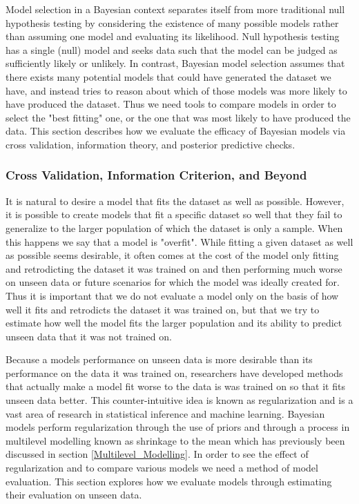 Model selection in a Bayesian context separates itself from more traditional null hypothesis testing by considering the existence of many possible models rather than assuming one model and evaluating its likelihood. Null hypothesis testing has a single (null) model and seeks data such that the model can be judged as sufficiently likely or unlikely. In contrast, Bayesian model selection assumes that there exists many potential models that could have generated the dataset we have, and instead tries to reason about which of those models was more likely to have produced the dataset. Thus we need tools to compare models in order to select the "best fitting" one, or the one that was most likely to have produced the data. This section describes how we evaluate the efficacy of Bayesian models via cross validation, information theory, and posterior predictive checks.

\subsubsection{Cross Validation, Information Criterion, and Beyond}
It is natural to desire a model that fits the dataset as well as possible. However, it is possible to create models that fit a specific dataset so well that they fail to generalize to the larger population of which the dataset is only a sample. When this happens we say that a model is "overfit". While fitting a given dataset as well as possible seems desirable, it often comes at the cost of the model only fitting and retrodicting the dataset it was trained on and then performing much worse on unseen data or future scenarios for which the model was ideally created for. Thus it is important that we do not evaluate a model only on the basis of how well it fits and retrodicts the dataset it was trained on, but that we try to estimate how well the model fits the larger population and its ability to predict unseen data that it was not trained on.

Because a models performance on unseen data is more desirable than its performance on the data it was trained on, researchers have developed methods that actually make a model fit worse to the data is was trained on so that it fits unseen data better. This counter-intuitive idea is known as regularization and is a vast area of research in statistical inference and machine learning. Bayesian models perform regularization through the use of priors and through a process in multilevel modelling known as shrinkage to the mean which has previously been discussed in section \ref{Multilevel_Modelling}. In order to see the effect of regularization and to compare various models we need a method of model evaluation. This section explores how we evaluate models through estimating their evaluation on unseen data.

